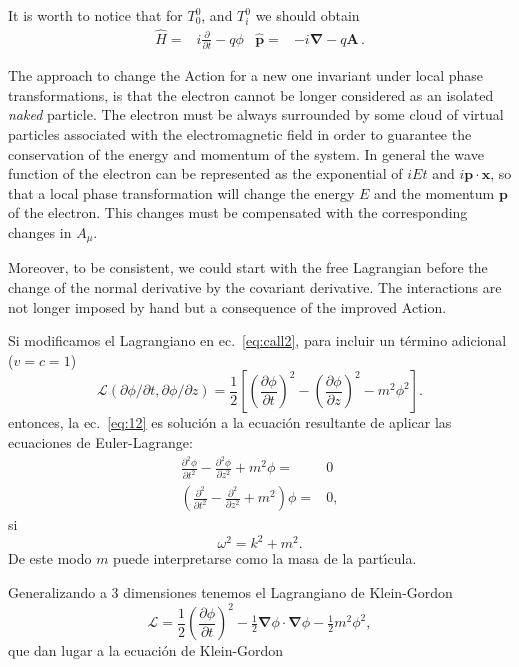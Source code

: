 It is worth to notice that for $T^0_0$, and $T^0_i$ we should obtain
\begin{align}
  \widehat{H}=& i\frac{\partial}{\partial t}-q\phi & \widehat{\mathbf{p}}=&-i\boldsymbol{\nabla}-q\mathbf{A}\,.
\end{align}

The approach to change the Action for a new one invariant under local phase  transformations, is that the electron cannot be longer considered as an isolated \emph{naked} particle. The electron must be always surrounded by some cloud of virtual particles associated with the electromagnetic field in order to guarantee the conservation of the energy and momentum of the system. In general the wave function of the electron can be represented as the exponential of $iEt$ and $i \mathbf{p}\cdot \mathbf{x}$, so that a local phase transformation will change the energy $E$ and the momentum $\mathbf{p}$ of the electron. This changes must be compensated with the corresponding changes in $A_{\mu}$.

Moreover, to be consistent, we could start with the free Lagrangian before the change of the normal derivative by the covariant derivative. The interactions are not longer imposed by hand but a consequence of the improved Action. 


Si modificamos el Lagrangiano en ec.~\eqref{eq:call2}, para incluir un
t\'ermino adicional ($v=c=1$)
\begin{equation}
  \label{eq:14}
  \mathcal{L}(\partial\phi/\partial t,\partial\phi/\partial z)=\frac{1}{2}
\left[
  \left(\frac{\partial\phi}{\partial t}\right)^2-\left(\frac{\partial\phi}{\partial z}\right)^2-m^2\phi^2
\right].
\end{equation}
entonces, la ec.~\eqref{eq:12} es soluci\'on a la ecuaci\'on resultante de
aplicar las ecuaciones de Euler-Lagrange:
\begin{align}
\label{eq:150}
      \frac{\partial^2\phi}{\partial t^2}-\frac{\partial^2\phi}{\partial z^2}+m^2\phi=&0\nonumber\\
      \left(\frac{\partial^2}{\partial t^2}-\frac{\partial^2}{\partial z^2}+m^2
      \right)\phi=&0,
\end{align}
si
\begin{equation}
  \omega^2=k^2+m^2.
\end{equation}
De este modo $m$ puede interpretarse como la masa de la part\'\i cula. 

Generalizando a 3 dimensiones tenemos el Lagrangiano de Klein-Gordon
\begin{equation}
  \label{eq:15}
  \mathcal{L}=\frac{1}{2}
  \left(
\frac{\partial\phi}{\partial t}
  \right)^2-\tfrac{1}{2}\boldsymbol{\nabla}\phi\cdot\boldsymbol{\nabla}\phi-\tfrac{1}{2}m^2\phi^2,
\end{equation}
que dan lugar a la ecuaci\'on de Klein-Gordon

